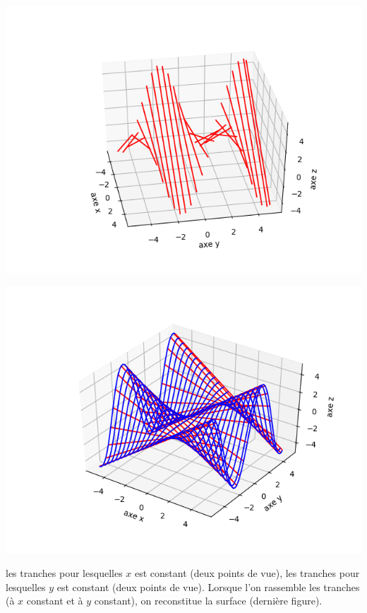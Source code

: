 \documentclass[11pt,class=report,crop=false]{standalone}
\begin{document}
\begin{exemple}
\begin{center}
\includegraphics[scale=\myscale,scale=0.5]{figures/fonctions-surface-2d}

\includegraphics[scale=\myscale,scale=0.7]{figures/fonctions-surface-2e}
\end{center}

 les tranches pour lesquelles $x$ est constant (deux points de vue),  les tranches pour lesquelles $y$ est constant (deux points de vue). Lorsque l'on rassemble les tranches (à $x$ constant et à $y$ constant), on reconstitue la surface (dernière figure). 


\end{exemple}
\end{document}
